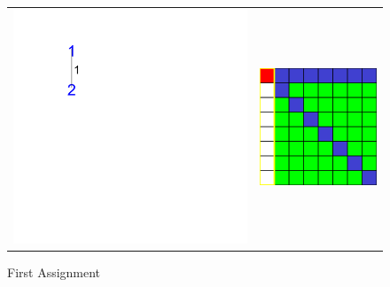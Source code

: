 \begin{frame}
{
\vfill
{}
}
\end{frame}

\begin{figure}[h]
\caption{\label{nqueen:first assignment} First Assignment}
\begin{center}
\begin{tabular}[t]{cc}
\includegraphics[width=8cm]{../nqueen/full/tree_expanded_2}
&
\includegraphics[width=4cm]{../nqueen/full/frame2}
\end{tabular}
\end{center}
\end{figure}

